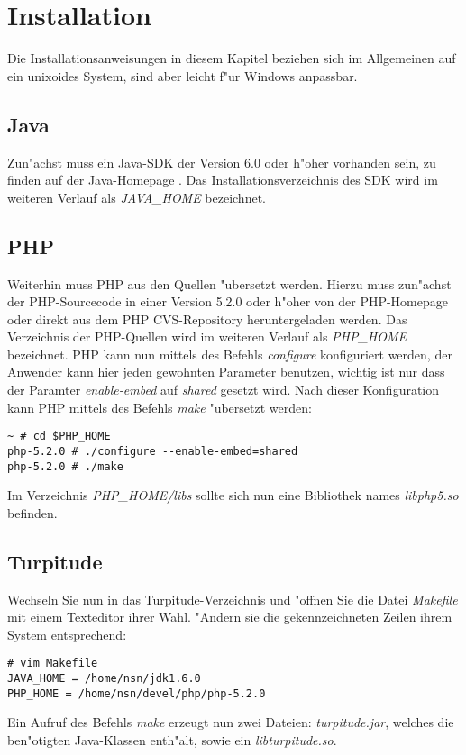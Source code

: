 \section{Installation}
\label{sec:app1:inst}

Die Installationsanweisungen in diesem Kapitel beziehen sich im Allgemeinen auf ein unixoides
System, sind aber leicht f"ur Windows anpassbar.

\subsection{Java}
\label{sec:app1:inst:java}

Zun"achst muss ein Java-SDK der Version 6.0 oder h"oher vorhanden sein, zu finden auf der
Java-Homepage \cite{JAVAHP}. Das Installationsverzeichnis des SDK wird im weiteren Verlauf als
\emph{JAVA\_HOME} bezeichnet.

\subsection{PHP}
\label{sec:app1:inst:php}
Weiterhin muss PHP aus den Quellen "ubersetzt werden. Hierzu muss zun"achst der PHP-Sourcecode in
einer Version 5.2.0 oder h"oher von der PHP-Homepage \cite{PHPHP} oder direkt aus dem PHP 
CVS-Repository heruntergeladen werden. Das Verzeichnis der PHP-Quellen wird im weiteren Verlauf
als \emph{PHP\_HOME} bezeichnet. PHP kann nun mittels des Befehls \emph{configure} konfiguriert werden,
der Anwender kann hier jeden gewohnten Parameter benutzen, wichtig ist nur dass der Paramter
\emph{enable-embed} auf \emph{shared} gesetzt wird. Nach dieser Konfiguration kann PHP mittels des
Befehls \emph{make} "ubersetzt werden:

\begin{lstlisting}[caption=Konfigurieren und "Ubersetzen von PHP]
~ # cd $PHP_HOME
php-5.2.0 # ./configure --enable-embed=shared 
php-5.2.0 # ./make
\end{lstlisting}

Im Verzeichnis \emph{PHP\_HOME/libs} sollte sich nun eine Bibliothek names \emph{libphp5.so} befinden.

\subsection{Turpitude}
\label{sec:app1:inst:turp}

Wechseln Sie nun in das Turpitude-Verzeichnis und "offnen Sie die Datei \emph{Makefile} mit einem 
Texteditor ihrer Wahl. "Andern sie die gekennzeichneten Zeilen ihrem System entsprechend:

\begin{lstlisting}[caption=Anpassen des Makefiles]
# vim Makefile
JAVA_HOME = /home/nsn/jdk1.6.0
PHP_HOME = /home/nsn/devel/php/php-5.2.0
\end{lstlisting}

Ein Aufruf des Befehls \emph{make} erzeugt nun zwei Dateien: \emph{turpitude.jar}, welches die
ben"otigten Java-Klassen enth"alt, sowie ein \emph{libturpitude.so}.

